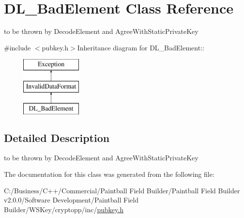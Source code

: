\hypertarget{class_d_l___bad_element}{
\section{DL\_\-BadElement Class Reference}
\label{class_d_l___bad_element}
}


to be thrown by DecodeElement and AgreeWithStaticPrivateKey  


{\ttfamily \#include $<$pubkey.h$>$}Inheritance diagram for DL\_\-BadElement::\begin{figure}[H]
\begin{center}
\leavevmode
\includegraphics[height=3cm]{class_d_l___bad_element}
\end{center}
\end{figure}


\subsection{Detailed Description}
to be thrown by DecodeElement and AgreeWithStaticPrivateKey 

The documentation for this class was generated from the following file:\begin{DoxyCompactItemize}
\item 
C:/Business/C++/Commercial/Paintball Field Builder/Paintball Field Builder v2.0.0/Software Development/Paintball Field Builder/WSKey/cryptopp/inc/\hyperlink{pubkey_8h}{pubkey.h}\end{DoxyCompactItemize}
